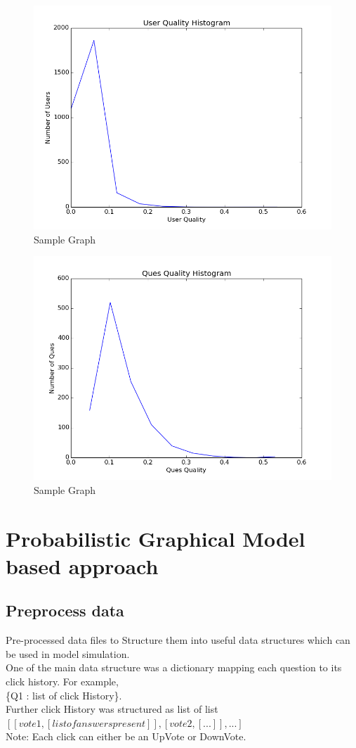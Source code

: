\documentclass{article}
\begin{document}
\begin{figure}[H]
\centering
\includegraphics[width=12cm]{result_LS/UQualHist.png}
\caption{Sample Graph}
\label{fig1:overview}
\end{figure}
\begin{figure}[H]
\centering
\includegraphics[width=12cm]{result_LS/QQualHist.png}
\caption{Sample Graph}
\label{fig1:overview}
\end{figure}

\newpage
\section{Probabilistic Graphical Model based approach}
\subsection{Preprocess data}
Pre-processed data files to Structure them into useful data structures which can
be used in model simulation.\\
One of the main data structure was a dictionary mapping each question to its 
click history. For example, \\
\{Q1 : list of click History\}. \\
Further click History was structured as list of list \\
$[[vote1, [list of answers present]], [vote2, [...]], ...] $ \\
Note: Each click can either be an UpVote or DownVote.\\
\end{document}
